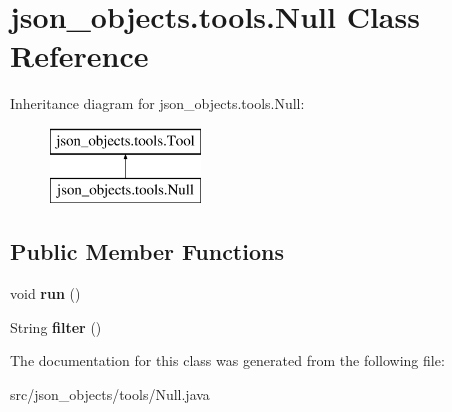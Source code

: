 \hypertarget{classjson__objects_1_1tools_1_1_null}{
\section{json\_\-objects.tools.Null Class Reference}
\label{classjson__objects_1_1tools_1_1_null}
}
Inheritance diagram for json\_\-objects.tools.Null:\begin{figure}[H]
\begin{center}
\leavevmode
\includegraphics[height=2.000000cm]{classjson__objects_1_1tools_1_1_null}
\end{center}
\end{figure}
\subsection*{Public Member Functions}
\begin{DoxyCompactItemize}
\item 
\hypertarget{classjson__objects_1_1tools_1_1_null_a30294727fe3f7cea9b44292252eb23c5}{
void {\bfseries run} ()}
\label{classjson__objects_1_1tools_1_1_null_a30294727fe3f7cea9b44292252eb23c5}

\item 
\hypertarget{classjson__objects_1_1tools_1_1_null_ade4bb46729436ffa3889623586c04e52}{
String {\bfseries filter} ()}
\label{classjson__objects_1_1tools_1_1_null_ade4bb46729436ffa3889623586c04e52}

\end{DoxyCompactItemize}


The documentation for this class was generated from the following file:\begin{DoxyCompactItemize}
\item 
src/json\_\-objects/tools/Null.java\end{DoxyCompactItemize}
